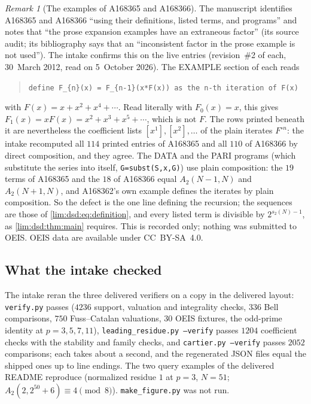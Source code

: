 \documentclass[11pt]{article}
\theoremstyle{definition}
\theoremstyle{remark}
\newtheorem{remark}[theorem]{Remark}
\begin{document}
\begin{remark}[The examples of A168365 and A168366]
\label{lim:dsd:rem:oeis-example}
The manuscript identifies A168365 and A168366 ``using their definitions,
listed terms, and programs'' and notes that ``the prose expansion examples
have an extraneous factor'' (its source audit; its bibliography says that
an ``inconsistent factor in the prose example is not used''). The intake
confirms this on the live entries (revision~\#2 of each, 30~March 2012,
read on 5~October 2026). The EXAMPLE section of each reads
\begin{quote}\small
\texttt{define F\_\{n\}(x) = F\_\{n-1\}(x*F(x)) as the n-th iteration of F(x)}
\end{quote}
with $F(x)=x+x^2+x^4+\cdots$. Read literally with $F_0(x)=x$, this gives
$F_1(x)=xF(x)=x^2+x^3+x^5+\cdots$, which is not $F$. The rows printed
beneath it are nevertheless the coefficient lists
$[x^1],[x^2],\ldots$ of the plain iterates $F^{\circ n}$: the intake
recomputed all $114$ printed entries of A168365 and all $110$ of A168366 by
direct composition, and they agree. The DATA and the PARI programs (which
substitute the series into itself, \texttt{G=subst(S,x,G)}) use plain
composition: the $19$ terms of A168365 and the $18$ of A168366 equal
$A_2(N-1,N)$ and $A_2(N+1,N)$, and A168362's own example defines the
iterates by plain composition. So the defect is the one line defining the
recursion; the sequences are those of \eqref{lim:dsd:eq:definition}, and
every listed term is divisible by $2^{s_2(N)-1}$, as \cref{lim:dsd:thm:main}
requires. This is recorded only; nothing was submitted to OEIS. OEIS data
are available under CC~BY-SA~4.0.
\end{remark}

\subsection{What the intake checked}
\label{lim:dsd:sec:intake}

The intake reran the three delivered verifiers on a copy in the delivered
layout: \texttt{verify.py} passes ($4236$ support, valuation and integrality
checks, $336$ Bell comparisons, $750$ Fuss--Catalan valuations, $30$ OEIS
fixtures, the odd-prime identity at $p=3,5,7,11$),
\texttt{leading\_residue.py --verify} passes $1204$ coefficient checks with
the stability and family checks, and \texttt{cartier.py --verify} passes
$2052$ comparisons; each takes about a second, and the regenerated JSON
files equal the shipped ones up to line endings. The two query examples of
the delivered README reproduce (normalized residue $1$ at $p=3$, $N=51$;
$A_2(2,2^{50}+6)\equiv4\pmod8$). \texttt{make\_figure.py} was not run.
\end{document}
